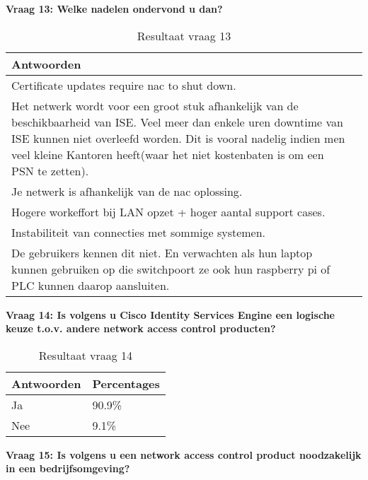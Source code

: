 \newpage
\textbf{Vraag 13: Welke nadelen ondervond u dan?}
\begin{table}[H]
	\begin{center}
		\setlength{}
		\noindent\begin{tabular}{p{\q}p{\q}}
			\hline
		\bf Antwoorden \\ \hline
		Certificate updates require nac to shut down. \\ \hline
		Het netwerk wordt voor een groot stuk afhankelijk van de beschikbaarheid van ISE. Veel meer dan enkele uren downtime van ISE kunnen niet overleefd worden. Dit is vooral nadelig indien men veel kleine Kantoren heeft(waar het niet kostenbaten is om een PSN te zetten). \\ \hline
		Je netwerk is afhankelijk van de nac oplossing.  \\ \hline
		Hogere workeffort bij LAN opzet + hoger aantal support cases. \\ \hline
		Instabiliteit van connecties met sommige systemen. \\ \hline
		De gebruikers kennen dit niet. En verwachten als hun laptop kunnen gebruiken op die switchpoort ze ook hun raspberry pi of PLC kunnen daarop aansluiten.       \\ \hline                                                  
		\end{tabular}
		\caption{Resultaat vraag 13}
		\label{tab:vraag13}
	\end{center}
\end{table}

\textbf{Vraag 14: Is volgens u Cisco Identity Services Engine een logische keuze t.o.v. andere network access control producten?} 

\begin{table}[H]
	\begin{center}
		\begin{tabular}{|l|l|}
			\hline
			\bf Antwoorden    & \bf Percentages \\ \hline
			Ja      & 90.9\% \\ \hline
			Nee     & 9.1\%    \\ \hline                                                           
		\end{tabular}
		\caption{Resultaat vraag 14}
	\end{center}
\end{table}

\textbf{Vraag 15: Is volgens u een network access control product noodzakelijk in een bedrijfsomgeving?}

